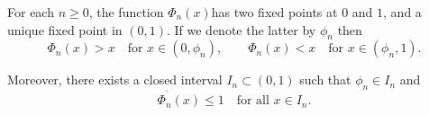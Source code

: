 \documentclass[10pt,a4paper]{amsart}
\begin{document}
\begin{lemma}
\label{Phi} \bigskip For each $n\geq 0$, the function $\Phi _{n}(x)$has two
fixed points at $0$ and $1$, and a unique fixed point in $(0,1)$. If we
denote the latter by $\phi _{n}$ then%
\begin{equation}
\Phi _{n}(x)>x\quad \text{for }x\in (0,\phi _{n}),\qquad \Phi _{n}(x)<x\quad 
\text{for }x\in (\phi _{n},1).  \label{172a1}
\end{equation}

Moreover, there exists a closed interval $I_{n}\subset (0,1)$ such that $%
\phi _{n}\in I_{n}$ and \ \ \ 
\begin{equation}
\Phi _{n}^{^{\prime }}(x)\leq 1\quad \text{for all }x\in I_{n}.
\label{172a2}
\end{equation}
\end{lemma}
\end{document}
